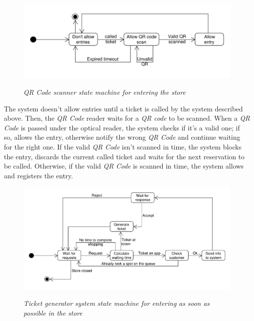 \documentclass{article}
\begin{document}
		\begin{figure}[!h]
			
			\centering
			\hspace*{-0.0cm}\includegraphics[scale=0.54]{StateCharts/qr_scanner_uml.pdf} \\
			\caption{\emph{QR Code scanner state machine for entering the store}}
			
		\end{figure}
		
		The system doesn't allow entries until a ticket is called by the system described above. Then, the \emph{QR Code} reader waits for a \emph{QR code} to be scanned. When a \emph{QR Code} is passed under the optical reader, the system checks if it's a valid one; if so, allows the entry, otherwise notify the wrong \emph{QR Code} and continue waiting for the right one. If the valid \emph{QR Code} isn't scanned in time, the system blocks the entry, discards the current called ticket and waits for the next reservation to be called. Otherwise, if the valid \emph{QR Code} is scanned in time, the system allows and registers the entry.
		
		\bigskip
		
		\begin{figure}[!h]
			
			\centering
			\hspace*{-1.9cm}\includegraphics[scale=0.55]{StateCharts/ticket_generation_system.pdf} \\
			\caption{\emph{Ticket generator system state machine for entering as soon as possible in the store}}
			
		\end{figure}
	
\end{document}

